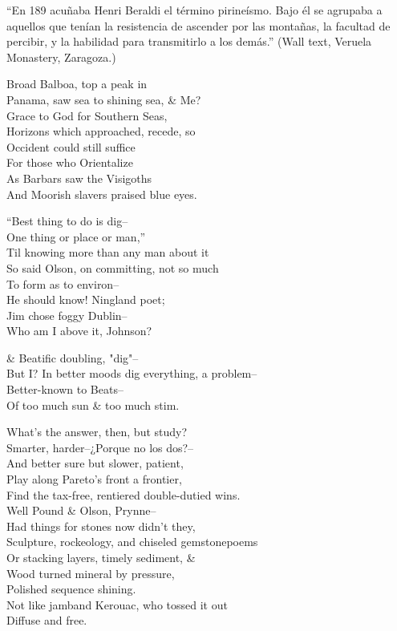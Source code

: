 ``En 189 acuñaba Henri Beraldi el término pirineísmo. Bajo él se agrupaba a aquellos que tenían la resistencia de ascender por las montañas, la facultad de percibir, y la habilidad para transmitirlo a los demás.'' (Wall text, Veruela Monastery, Zaragoza.)

Broad Balboa, top a peak in \\
Panama, saw sea to shining sea, \& Me? \\
Grace to God for Southern Seas, \\
Horizons which approached, recede, so \\
Occident could still suffice \\
For those who Orientalize \\
As Barbars saw the Visigoths \\
And Moorish slavers praised blue eyes.

``Best thing to do is dig-- \\
One thing or place or man,'' \\
Til knowing more than any man about it \\
So said Olson, on committing, not so much \\
To form as to environ-- \\
He should know! Ningland poet; \\
Jim chose foggy Dublin-- \\
Who am I above it, Johnson?

\& Beatific doubling, "dig"-- \\
But I? In better moods dig everything, a problem-- \\
Better-known to Beats-- \\
Of too much sun \& too much stim. 

What's the answer, then, but study? \\
Smarter, harder--¿Porque no los dos?-- \\
And better sure but slower, patient, \\
Play along Pareto's front a frontier, \\
Find the tax-free, rentiered double-dutied wins. \\
Well Pound \& Olson, Prynne-- \\
Had things for stones now didn't they, \\
Sculpture, rockeology, and chiseled gemstonepoems \\
Or stacking layers, timely sediment, \& \\
Wood turned mineral by pressure, \\
Polished sequence shining. \\
Not like jamband Kerouac, who tossed it out \\
Diffuse and free.

